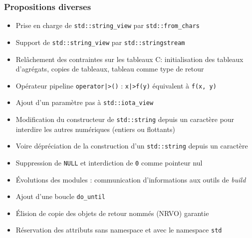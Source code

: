 \documentclass[C++.tex]{subfiles}
\begin{document}
\begin{frame}[fragile]
	\frametitle{Propositions diverses}
	\begin{itemize}
		\item Prise en charge de \lstinline|std::string_view| par \lstinline|std::from_chars|
		\item Support de \lstinline|std::string_view| par \lstinline|std::stringstream|
		\item Relâchement des contraintes sur les tableaux \og C\fg{}: initialisation des tableaux d'agrégats, copies de tableaux, tableau comme type de retour


		\item Opérateur pipeline \lstinline!operator|>()! :  \lstinline!x|>f(y)! équivalent à \lstinline|f(x, y)|
		\item Ajout d'un paramètre \og pas\fg{} à \lstinline|std::iota_view|
		\item Modification du constructeur de \lstinline|std::string| depuis un caractère pour interdire les autres numériques (entiers ou flottants)


		\item Voire dépréciation de la construction d'un \lstinline|std::string| depuis un caractère
		\item Suppression de \lstinline|NULL| et interdiction de \lstinline|0| comme pointeur nul
		\item Évolutions des modules : communication d'informations aux outils de \textit{build}
		\item Ajout d'une boucle \lstinline|do_until|
		\item Élision de copie des objets de retour nommés (NRVO) garantie


		\item Réservation des attributs sans namespace et avec le namespace \lstinline|std|


	\end{itemize}
\end{frame}
\end{document}
